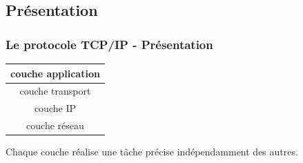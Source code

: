 \documentclass[svgnames,11pt]{beamer}
\begin{document}
\subsection{Présentation}
\begin{frame}
    \frametitle{Le protocole TCP/IP - Présentation}

    \begin{center}
        \begin{tabular}{|c|}
            \hline
            couche application \\
            \hline
            couche transport   \\
            \hline
            couche IP          \\
            \hline
            couche réseau      \\
            \hline
        \end{tabular}
    \end{center}

    \begin{aretenir}[]
        Chaque couche réalise une tâche précise indépendamment des autres.
    \end{aretenir}
\end{frame}
\end{document}

